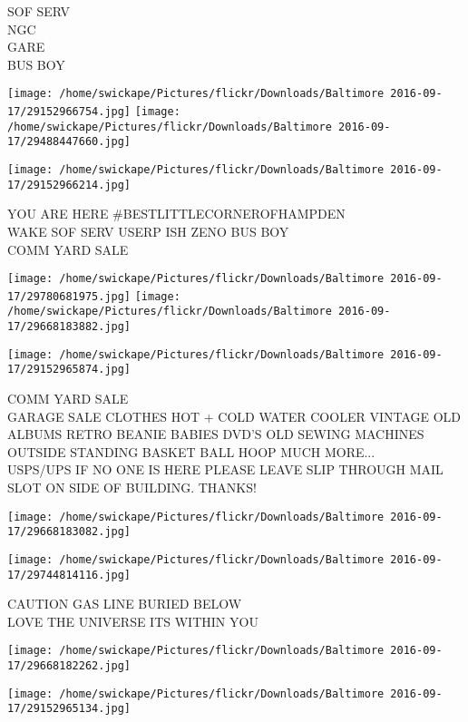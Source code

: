 \documentclass[10pt,letterpaper]{article}
\begin{document}
SOF SERV\\
NGC\\
GARE\\
BUS BOY
\pagebreak

\texttt{[image: /home/swickape/Pictures/flickr/Downloads/Baltimore 2016-09-17/29152966754.jpg]}
\texttt{[image: /home/swickape/Pictures/flickr/Downloads/Baltimore 2016-09-17/29488447660.jpg]}

\vspace{0.25in}
\texttt{[image: /home/swickape/Pictures/flickr/Downloads/Baltimore 2016-09-17/29152966214.jpg]}

YOU ARE HERE \#BESTLITTLECORNEROFHAMPDEN\\
WAKE SOF SERV USERP ISH ZENO BUS  BOY\\
COMM YARD SALE
\pagebreak

\texttt{[image: /home/swickape/Pictures/flickr/Downloads/Baltimore 2016-09-17/29780681975.jpg]}
\texttt{[image: /home/swickape/Pictures/flickr/Downloads/Baltimore 2016-09-17/29668183882.jpg]}

\texttt{[image: /home/swickape/Pictures/flickr/Downloads/Baltimore 2016-09-17/29152965874.jpg]}

COMM YARD SALE\\
GARAGE SALE CLOTHES HOT + COLD WATER COOLER VINTAGE OLD ALBUMS RETRO BEANIE BABIES DVD'S OLD SEWING MACHINES OUTSIDE STANDING BASKET BALL HOOP MUCH MORE...\\
USPS/UPS IF NO ONE IS HERE PLEASE LEAVE SLIP THROUGH MAIL SLOT ON SIDE OF BUILDING.  THANKS!
\pagebreak

\texttt{[image: /home/swickape/Pictures/flickr/Downloads/Baltimore 2016-09-17/29668183082.jpg]}

\vspace{0.25in}
\texttt{[image: /home/swickape/Pictures/flickr/Downloads/Baltimore 2016-09-17/29744814116.jpg]}

CAUTION GAS LINE BURIED BELOW\\
LOVE THE UNIVERSE ITS WITHIN YOU
\pagebreak

\texttt{[image: /home/swickape/Pictures/flickr/Downloads/Baltimore 2016-09-17/29668182262.jpg]}

\vspace{0.25in}
\texttt{[image: /home/swickape/Pictures/flickr/Downloads/Baltimore 2016-09-17/29152965134.jpg]}
\end{document}
